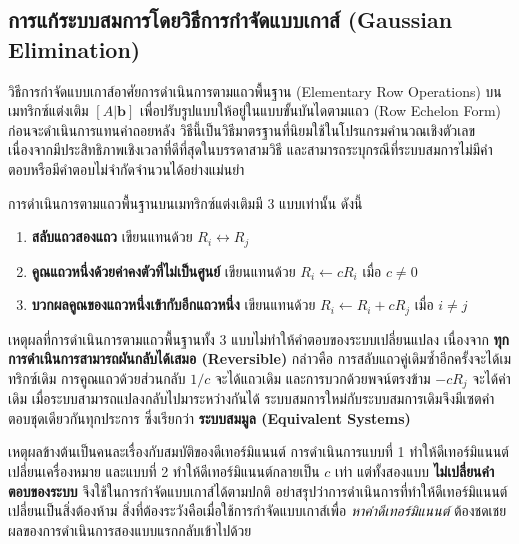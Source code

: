 \subsection{การแก้ระบบสมการโดยวิธีการกำจัดแบบเกาส์ (Gaussian Elimination)}
\label{ssec:gaussian-elimination}
วิธีการกำจัดแบบเกาส์อาศัยการดำเนินการตามแถวพื้นฐาน (Elementary Row Operations) บนเมทริกซ์แต่งเติม $[A|\mathbf{b}]$ เพื่อปรับรูปแบบให้อยู่ในแบบขั้นบันไดตามแถว (Row Echelon Form) ก่อนจะดำเนินการแทนค่าถอยหลัง วิธีนี้เป็นวิธีมาตรฐานที่นิยมใช้ในโปรแกรมคำนวณเชิงตัวเลข เนื่องจากมีประสิทธิภาพเชิงเวลาที่ดีที่สุดในบรรดาสามวิธี และสามารถระบุกรณีที่ระบบสมการไม่มีคำตอบหรือมีคำตอบไม่จำกัดจำนวนได้อย่างแม่นยำ~\parencite{kolman2008discrete}

\begin{principle}
\label{prin:row-operations}
การดำเนินการตามแถวพื้นฐานบนเมทริกซ์แต่งเติมมี 3 แบบเท่านั้น ดังนี้

\begin{enumerate}
    \item \textbf{สลับแถวสองแถว} เขียนแทนด้วย $R_i \leftrightarrow R_j$
    \item \textbf{คูณแถวหนึ่งด้วยค่าคงตัวที่ไม่เป็นศูนย์} เขียนแทนด้วย $R_i \leftarrow cR_i$ เมื่อ $c \neq 0$
    \item \textbf{บวกผลคูณของแถวหนึ่งเข้ากับอีกแถวหนึ่ง} เขียนแทนด้วย $R_i \leftarrow R_i + cR_j$ เมื่อ $i \neq j$
\end{enumerate}

เหตุผลที่การดำเนินการตามแถวพื้นฐานทั้ง 3 แบบไม่ทำให้คำตอบของระบบเปลี่ยนแปลง เนื่องจาก \textbf{ทุกการดำเนินการสามารถผันกลับได้เสมอ (Reversible)} กล่าวคือ การสลับแถวคู่เดิมซ้ำอีกครั้งจะได้เมทริกซ์เดิม การคูณแถวด้วยส่วนกลับ $1/c$ จะได้แถวเดิม และการบวกด้วยพจน์ตรงข้าม $-cR_j$ จะได้ค่าเดิม เมื่อระบบสามารถแปลงกลับไปมาระหว่างกันได้ ระบบสมการใหม่กับระบบสมการเดิมจึงมีเซตคำตอบชุดเดียวกันทุกประการ ซึ่งเรียกว่า \textbf{ระบบสมมูล (Equivalent Systems)}

\end{principle}

\begin{warning}
เหตุผลข้างต้นเป็นคนละเรื่องกับสมบัติของดีเทอร์มิแนนต์ การดำเนินการแบบที่ 1 ทำให้ดีเทอร์มิแนนต์เปลี่ยนเครื่องหมาย และแบบที่ 2 ทำให้ดีเทอร์มิแนนต์กลายเป็น $c$ เท่า แต่ทั้งสองแบบ \textbf{ไม่เปลี่ยนคำตอบของระบบ} จึงใช้ในการกำจัดแบบเกาส์ได้ตามปกติ อย่าสรุปว่าการดำเนินการที่ทำให้ดีเทอร์มิแนนต์เปลี่ยนเป็นสิ่งต้องห้าม สิ่งที่ต้องระวังคือเมื่อใช้การกำจัดแบบเกาส์เพื่อ \emph{หาค่าดีเทอร์มิแนนต์} ต้องชดเชยผลของการดำเนินการสองแบบแรกกลับเข้าไปด้วย
\end{warning}

